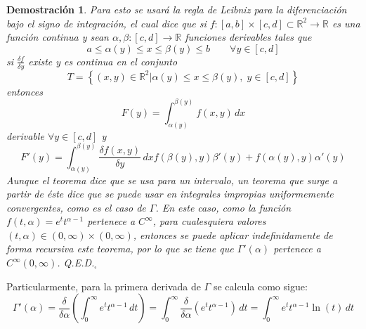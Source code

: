 \documentclass[a4paper,11pt]{article}
\theoremstyle{teoremas}
\theoremstyle{ejemplos}
\theoremstyle{definiciones}
\theoremstyle{lemas}
\newtheorem*{demostracion}{Demostraci\'on}
\begin{document}
\begin{demostracion}
 Para esto se usar\'a la regla de Leibniz para la diferenciaci\'on bajo el signo de integraci\'on, el cual dice que si $f:[a,b]\times [c,d] \subset \mathbb{R}^2 \to \mathbb{R}$ es una funci\'on continua y sean $\alpha,\beta: [c,d] \to \mathbb{R}$ funciones derivables tales que
 \begin{equation*}
  a \leq \alpha(y) \leq x \leq \beta(y) \leq b \qquad \forall y \in [c,d]
 \end{equation*}
 si $\frac{\delta f}{\delta y}$ existe y es continua en el conjunto
 \begin{equation*}
  T = \left\{ (x,y) \in \mathbb{R}^2 \left| \alpha(y) \leq x \leq \beta(y), \; y \in [c,d] \right. \right\}
 \end{equation*}
 entonces
 \begin{equation*}
  F(y) = \int_{\alpha(y)}^{\beta(y)} f(x,y) \, dx
 \end{equation*}
 derivable $\forall y \in [c,d]$ y
 \begin{equation*}
  F'(y) = \int_{\alpha(y)}^{\beta(y)} \frac{\delta f(x,y)}{\delta y} \, dx 
   f\left( \beta(y),y \right) \beta'(y) + f\left( \alpha(y), y \right) \alpha'(y)
 \end{equation*}
 Aunque el teorema dice que se usa para un intervalo, un teorema que surge a partir de \'este dice que se puede usar en integrales impropias uniformemente convergentes, como es el caso de $\Gamma$.
 En este caso, como la funci\'on $f(t,\alpha) = e^{t}t^{\alpha - 1}$ pertenece a $C^{\infty}$, para cualesquiera valores $(t,\alpha) \in (0,\infty)\times(0,\infty)$, entonces se puede aplicar indefinidamente de forma recursiva este teorema, por lo que se tiene que $\Gamma'(\alpha)$ pertenece a $C^{\infty}(0,\infty)$. Q.E.D.${}_{\square}$
\end{demostracion}

Particularmente, para la primera derivada de $\Gamma$ se calcula como sigue:
\begin{equation*}
 \Gamma'(\alpha) = \frac{\delta}{\delta \alpha} \left( \int_{0}^{\infty} e^t t^{\alpha - 1} \, dt \right) = \int_{0}^{\infty} \frac{\delta}{\delta \alpha} \left( e^t t^{\alpha - 1} \right) \, dt = \int_{0}^{\infty} e^{t} t^{\alpha - 1} \ln(t) \, dt
\end{equation*}
\end{document}
